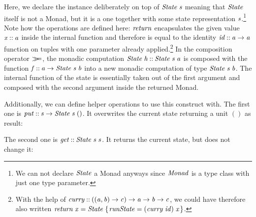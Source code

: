 \documentclass[paper=A4,twoside=true,openright,parskip=full,chapterprefix=true,headings=normal,bibliography=totoc,listof=totoc,titlepage=on,captions=tableabove,draft=false,british]{scrreprt}%
\begin{document}
Here, we declare the instance deliberately on top of \ensuremath{\Conid{State}\;\Varid{s}} meaning
that \ensuremath{\Conid{State}} itself is not a Monad, but it is a one together with some
state representation \ensuremath{\Varid{s}}.\footnote{We can not declare \ensuremath{\Conid{State}} a Monad
  anyways since \ensuremath{\Conid{Monad}} is a type class with just one type parameter.}
Note how the operations are defined here: \ensuremath{\Varid{return}} encapsulates the
given value \ensuremath{\Varid{x}\mathbin{::}\Varid{a}} inside the internal function and therefore is equal
to the identity \ensuremath{\Varid{id}\mathbin{::}\Varid{a}\to \Varid{a}} function on tuples with one parameter
already applied.\footnote{With the help of
  \ensuremath{\Varid{curry}\mathbin{::}((\Varid{a},\Varid{b})\to \Varid{c})\to \Varid{a}\to \Varid{b}\to \Varid{c}}, we could have therefore also
  written \ensuremath{\Varid{return}\;\Varid{x}\mathrel{=}\Conid{State}\;\{\mskip1.5mu \Varid{runState}\mathrel{=}(\Varid{curry}\;\Varid{id})\;\Varid{x}\mskip1.5mu\}}.} In the
composition operator \ensuremath{\bind }, the monadic computation
\ensuremath{\Conid{State}\;\Varid{h}\mathbin{::}\Conid{State}\;\Varid{s}\;\Varid{a}} is composed with the function
\ensuremath{\Varid{f}\mathbin{::}\Varid{a}\to \Conid{State}\;\Varid{s}\;\Varid{b}} into a new monadic computation of type
\ensuremath{\Conid{State}\;\Varid{s}\;\Varid{b}}. The internal function of the state is essentially taken out
of the first argument and composed with the second argument inside the
returned Monad.

Additionally, we can define helper operations to use this construct
with. The first one is \ensuremath{\Varid{put}\mathbin{::}\Varid{s}\to \Conid{State}\;\Varid{s}\;()}. It overwrites the
current state returning a unit \ensuremath{()} as result:


\resethooks
\vspace{-2\baselineskip}

The second one is \ensuremath{\Varid{get}\mathbin{::}\Conid{State}\;\Varid{s}\;\Varid{s}}. It returns the current state, but
does not change it:
\end{document}
